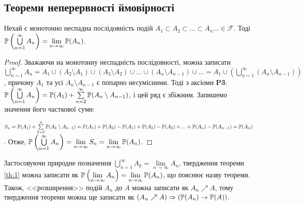 \subsection{Теореми неперервності ймовірності}
\begin{theorem}\label{th:1}
    Нехай є монотонно неспадна послідовність подій $A_1 \subset A_2 \subset ... \subset A_n ... \in \mathcal{F}$.
    Тоді $\P\left(\bigcup\limits_{n=1}^{\infty} A_n\right) = \lim\limits_{n\rightarrow \infty} \P(A_n)$.
\end{theorem}
\begin{proof}
    Зважаючи на монотонну неспадність послідовності, можна записати $\bigcup\limits_{n=1}^{\infty} A_n = A_1 \cup (A_2 \setminus A_1) \cup (A_3 \setminus A_2) \cup ... \cup (A_{n} \setminus A_{n-1}) \cup ... =
    A_1 \cup \left(\bigcup\limits_{n=1}^{\infty} (A_n \setminus A_{n-1})\right)$, причому $A_1$ та усі $A_n \setminus A_{n-1}$ є попарно несумісними.
    Тоді з аксіоми \textbf{P3}: $\P\left(\bigcup\limits_{n=1}^{\infty} A_n\right) = \P(A_1) + \sum\limits_{n=2}^{\infty} \P(A_{n} \setminus A_{n-1})$,
    і цей ряд є збіжним. Запишемо значення його часткової суми:

    \noindent $S_n = \P(A_1) + \sum\limits_{k=2}^{n} \P(A_{k} \setminus A_{k-1}) = \P(A_1) + \P(A_2) - \P(A_1) + \P(A_3) - \P(A_2) + ... + \P(A_n) - \P(A_{n-1}) = \P(A_n)$.
    Отже, $\P\left(\bigcup\limits_{n=1}^{\infty} A_n\right) = \lim\limits_{n\rightarrow \infty} S_n = \lim\limits_{n\rightarrow \infty} \P(A_n)$.
\end{proof}
\begin{remark}
    Застосовуючи природне позначення $\bigcup\limits_{n=1}^{\infty} A_k = \lim\limits_{n\rightarrow \infty} A_n$, твердження теореми \ref{th:1}
    можна записати як $\P\left( \lim\limits_{n\rightarrow \infty} A_n\right) = \lim\limits_{n\rightarrow \infty} \P(A_n)$, що пояснює назву теореми.
    Також, <<розширення>> подій $A_n$ до $A$ можна записати як $A_n \nearrow A$, тому твердження теореми можна ще записати як
    $\left(A_n \nearrow A\right) \Rightarrow \left(\P(A_n) \rightarrow \P(A)\right)$.
\end{remark}

